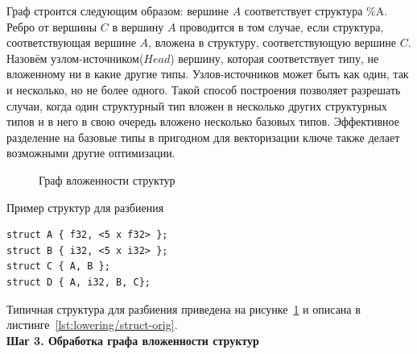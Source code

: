 Граф строится следующим образом: вершине $A$ соответствует структура \%A. Ребро от вершины $C$ в вершину $A$ проводится в том случае, если структура, соответствующая вершине $A$, вложена в структуру, соответствующую вершине $C$. Назовём узлом-источником($Head$) вершину, которая соответствует типу, не вложенному ни в какие другие типы. Узлов-источников может быть как один, так и несколько, но не более одного. Такой способ построения позволяет разрешать случаи, когда один структурный тип вложен в несколько других структурных типов и в него в свою очередь вложено несколько базовых типов. Эффективное разделение на базовые типы в пригодном для векторизации ключе также делает возможными другие оптимизации.

\begin{figure}[ht]
    \caption{Граф вложенности структур}\label{fig:struct-orig}
\end{figure}

\begin{ListingEnv}[!h]
    \captiondelim{ } 
    \caption{Пример структур для разбиения}\label{lst:lowering/struct-orig}
    \begin{lstlisting}[language={[ISO]C++}]
struct A { f32, <5 x f32> };
struct B { i32, <5 x i32> };
struct C { A, B };
struct D { A, i32, B, C};
    \end{lstlisting}
\end{ListingEnv}

Типичная структура для разбиения приведена на рисунке~\cref{fig:struct-orig} и описана в листинге~\cref{lst:lowering/struct-orig}.\\

\textbf{Шаг 3. Обработка графа вложенности структур}\\

